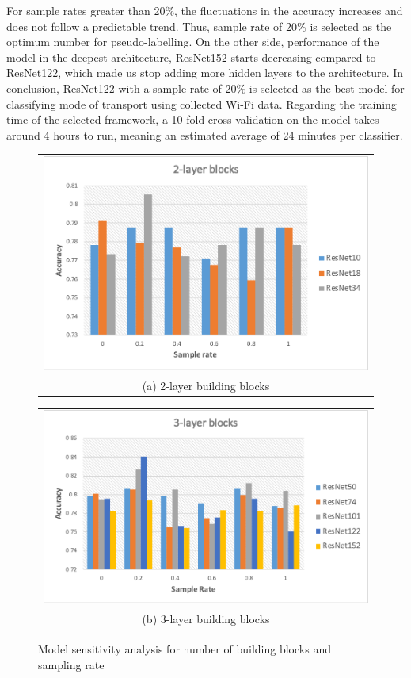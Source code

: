  For sample rates greater than 20\%, the fluctuations in the accuracy increases and does not follow a predictable trend. Thus, sample rate of 20\% is selected as the optimum number for pseudo-labelling. On the other side, performance of the model in the deepest architecture, ResNet152 starts decreasing compared to ResNet122, which made us stop adding more hidden layers to the architecture. In conclusion, ResNet122 with a sample rate of 20\% is selected as the best model for classifying mode of transport using collected Wi-Fi data. Regarding the training time of the selected framework, a 10-fold cross-validation on the model takes around 4 hours to run, meaning an estimated average of 24 minutes per classifier.
 \clearpage
\begin{figure}[!ht]
  \centering
  \begin{tabular}{@{}c@{}}
    \includegraphics[width=0.8\linewidth]{chapter_2/figures/2layer.pdf} \\[\abovecaptionskip]
    \small (a) 2-layer building blocks
  \end{tabular}

  \vspace{\floatsep}

  \begin{tabular}{@{}c@{}}
    \includegraphics[width=0.8\linewidth]{chapter_2/figures/3layer.pdf} \\[\abovecaptionskip]
    \small (b) 3-layer building blocks
  \end{tabular}

  \caption{Model sensitivity analysis for number of building blocks and sampling rate}\label{fig:results2}
\end{figure}

